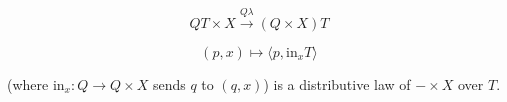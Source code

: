 $$QT \times X \xrightarrow{Q\lambda} (Q \times X)T$$

$$(p, x) \mapsto \langle p, \text{in}_x T \rangle$$

(where $\text{in}_x: Q \longrightarrow Q \times X$ sends $q$ to $(q, x)$) is a distributive law of $- \times X$ over $T$.